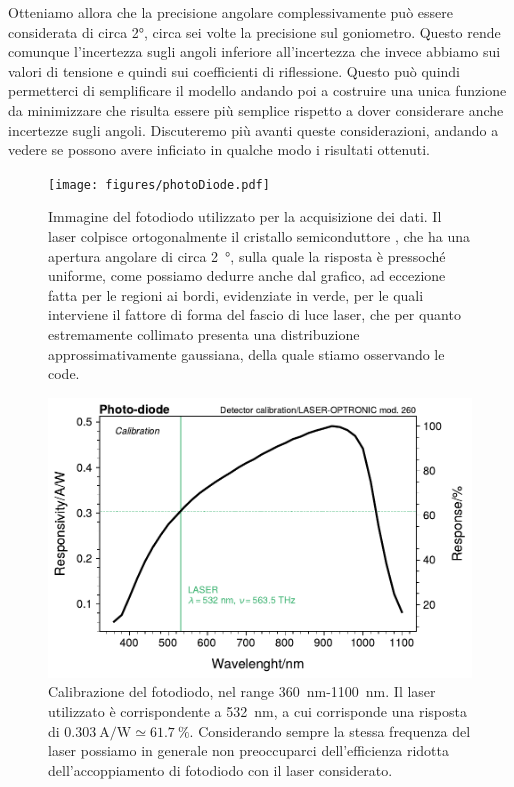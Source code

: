 \documentclass[prb,showpacs,floatfix,altaffilletter,amsmath,amssymb,reprint,citeautoscript,showkeys]{revtex4-1}
\begin{document}
Otteniamo allora che la precisione angolare complessivamente può essere considerata di circa \ang{2}, circa sei volte la precisione sul goniometro. Questo rende comunque l'incertezza sugli angoli inferiore all'incertezza che invece abbiamo sui valori di tensione e quindi sui coefficienti di riflessione. Questo può quindi permetterci di semplificare il modello andando poi a costruire una unica funzione da minimizzare che risulta essere più semplice rispetto a dover considerare anche incertezze sugli angoli. Discuteremo più avanti queste considerazioni, andando a vedere se possono avere inficiato in qualche modo i risultati ottenuti. 

\begin{figure}
    \centering
    \texttt{[image: figures/photoDiode.pdf]}
    \caption{Immagine del fotodiodo utilizzato per la acquisizione dei dati. Il laser colpisce ortogonalmente il cristallo semiconduttore , che ha una apertura angolare di circa \SI{2}{\degree}, sulla quale la risposta è pressoché uniforme, come possiamo dedurre anche dal grafico, ad eccezione fatta per le regioni ai bordi, evidenziate in verde, per le quali interviene il fattore di forma del fascio di luce laser, che per quanto estremamente collimato presenta una distribuzione approssimativamente gaussiana, della quale stiamo osservando le code.}
    \label{fig:photo-diode}
\end{figure}

\begin{figure}
    \centering
    \includegraphics[width=\linewidth]{figures/detector_calib.pdf}
    \caption{Calibrazione del fotodiodo, nel range \SI{360}{\nano\metre}-\SI{1100}{\nano\metre}. Il laser utilizzato è corrispondente a \SI{532}{\nano\metre}, a cui corrisponde una risposta di $\SI{0.303}{\ampere\per\watt}\simeq\SI{61.7}{\%}$. Considerando sempre la stessa frequenza del laser possiamo in generale non preoccuparci dell'efficienza ridotta dell'accoppiamento di fotodiodo con il laser considerato.}
    \label{fig:detector_calib}
\end{figure}
\end{document}

